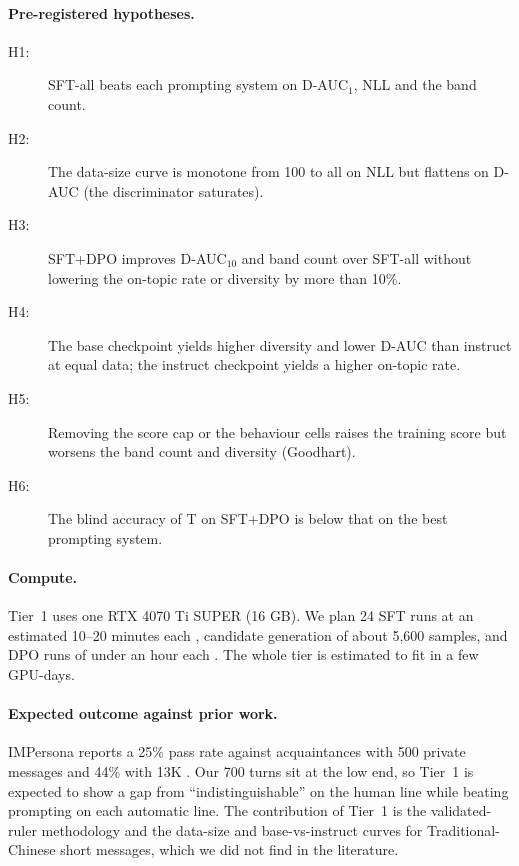 \paragraph{Pre-registered hypotheses.}
\begin{description}
\item[H1:] SFT-all beats each prompting system on D-AUC$_1$, NLL and the band count.
\item[H2:] The data-size curve is monotone from 100 to all on NLL but flattens on D-AUC (the discriminator saturates).
\item[H3:] SFT+DPO improves D-AUC$_{10}$ and band count over SFT-all without lowering the on-topic rate or diversity by more than 10\%.
\item[H4:] The base checkpoint yields higher diversity and lower D-AUC than instruct at equal data; the instruct checkpoint yields a higher on-topic rate.
\item[H5:] Removing the score cap or the behaviour cells raises the training score but worsens the band count and diversity (Goodhart).
\item[H6:] The blind accuracy of T on SFT+DPO is below that on the best prompting system.
\end{description}

\paragraph{Compute.}
Tier~1 uses one RTX 4070 Ti SUPER (16 GB).
We plan 24 SFT runs at an estimated 10--20 minutes each , candidate generation of about 5,600 samples, and DPO runs of under an hour each .
The whole tier is estimated to fit in a few GPU-days.

\paragraph{Expected outcome against prior work.}
IMPersona reports a 25\% pass rate against acquaintances with 500 private messages and 44\% with 13K \citep{shi2025impersona}.
Our 700 turns sit at the low end, so Tier~1 is expected to show a gap from ``indistinguishable'' on the human line while beating prompting on each automatic line.
The contribution of Tier~1 is the validated-ruler methodology and the data-size and base-vs-instruct curves for Traditional-Chinese short messages, which we did not find in the literature.


